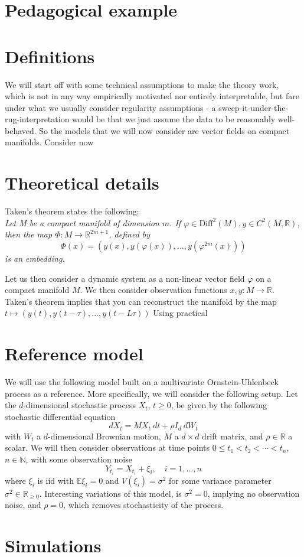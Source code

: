 \documentclass[11pt, a4paper]{memoir}
\begin{document}
\section{Pedagogical example}

\section{Definitions}
We will start off with some technical assumptions to make the theory work, which is not in any way empirically motivated nor entirely interpretable, but fare under what we usually consider regularity assumptions - a sweep-it-under-the-rug-interpretation would be that we just assume the data to be reasonably well-behaved. So the models that we will now consider are vector fields on compact manifolds. Consider now 
\section{Theoretical details}
Taken's theorem states the following:\\
\textit{Let M be a compact manifold of dimension $m$. If $\varphi\in \text{Diff}^2(M), y\in C^2(M,\mathbb{R})$, then the map $\Phi:M\to \mathbb{R}^{2m+1}$, defined by
$$\Phi(x)=(y(x),y(\varphi(x)),...,y(\varphi^{2m}(x)))$$
is an embedding.}

Let us then consider a dynamic system as a non-linear vector field $\varphi$ on a compact manifold $M$. We then consider observation functions $x,y: M\to \mathbb{R}$. Taken's theorem implies that you can reconstruct the manifold by the map
$t\mapsto (y(t),y(t-\tau),...,y(t-L\tau))$
Using practical  
\section{Reference model}
We will use the following model built on a multivariate Ornstein-Uhlenbeck process as a reference. More specifically, we will consider the following setup. Let the $d$-dimensional stochastic process $X_t$, $t\geq 0$, be given by the following stochastic differential equation
$$dX_t=M X_t\ dt+\rho I_d\ dW_t$$
with $W_t$ a $d$-dimensional  Brownian motion, $M$ a $d\times d$ drift matrix, and $\rho\in \mathbb{R}$ a scalar. We will then consider observations at time points $0\leq t_1<t_2<\cdots <t_n$, $n\in \mathbb{N}$, with some observation noise
$$Y_{t_i}=X_{t_i}+\xi_i,\quad i=1,...,n$$
where $\xi_i$ is iid with $\mathbb{E} \xi_i=0$ and $V(\xi_i)=\sigma^2$ for some variance parameter $\sigma^2\in \mathbb{R}_{\geq 0}$. Interesting variations of this model, is $\sigma^2=0$, implying no observation noise, and $\rho=0$, which removes stochasticity of the process.


\section{Simulations}
 
 
\normalem


\end{document}
